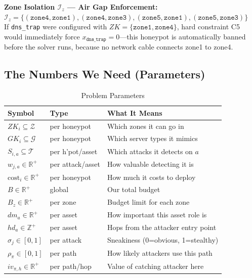 \documentclass[journal]{IEEEtran}
\newcommand{\calT}{\mathcal{T}}
\newcommand{\calZ}{\mathcal{Z}}
\newcommand{\calG}{\mathcal{G}}
\begin{document}
\begin{examplebox}
\textbf{Zone Isolation $\mathcal{I}_z$ --- Air Gap
Enforcement:}\\[3pt]
$\mathcal{I}_z = \{(\texttt{zone4},\texttt{zone1}),
(\texttt{zone4},\texttt{zone3}),
(\texttt{zone5},\texttt{zone1}),
(\texttt{zone5},\texttt{zone3})\}$\\[4pt]
If \texttt{dns\_trap} were configured with
$ZK = \{\texttt{zone1},\texttt{zone4}\}$, hard constraint C5
would immediately force $x_{\texttt{dns\_trap}} = 0$---this
honeypot is automatically banned before the solver runs,
because no network cable connects zone1 to zone4.
\end{examplebox}

\subsection{The Numbers We Need (Parameters)}

\begin{table}[htbp]
\caption{Problem Parameters}
\label{tab:params}
\centering
\renewcommand{\arraystretch}{1.2}
\begin{tabular}{@{}lll@{}}
\toprule
\textbf{Symbol} & \textbf{Type} & \textbf{What It Means} \\
\midrule
$ZK_i \subseteq \calZ$        & per honeypot  & Which zones it can go in \\
$GK_i \subseteq \calG$        & per honeypot  & Which server types it mimics \\
$S_{i,a} \subseteq \calT$     & per h'pot/asset& Which attacks it detects on $a$ \\
$w_{j,a} \in \mathbb{R}^+$    & per attack/asset& How valuable detecting it is \\
$\mathrm{cost}_i \in \mathbb{R}^+$ & per honeypot & How much it costs to deploy \\
$B \in \mathbb{R}^+$          & global        & Our total budget \\
$B_z \in \mathbb{R}^+$        & per zone      & Budget limit for each zone \\
$dm_a \in \mathbb{R}^+$       & per asset     & How important this asset role is \\
$hd_a \in \mathbb{Z}^+$       & per asset     & Hops from the attacker entry point \\
$\sigma_j \in [0,1]$          & per attack    & Sneakiness (0=obvious, 1=stealthy) \\
$\rho_\pi \in [0,1]$          & per path      & How likely attackers use this path \\
$iv_{\pi,h} \in \mathbb{R}^+$ & per path/hop  & Value of catching attacker here \\
\bottomrule
\end{tabular}
\end{table}
\end{document}

